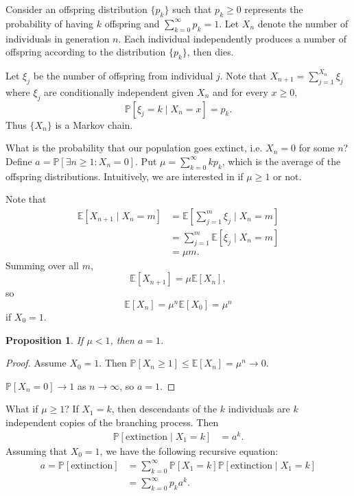 \documentclass{tufte-handout}
\newcommand*\E{\mathbb{E}}
\renewcommand*\P{\mathbb{P}}
\newtheorem{prop}[thm]{Proposition}
\theoremstyle{definition}
\begin{document}
Consider an offspring distribution $\{p_k\}$ such that $p_k \ge 0$ represents the probability of having $k$ offspring and $\sum_{k=0}^{\infty} p_k =1$. Let $X_n$ denote the number of individuals in generation $n$. Each individual independently produces a number of offspring according to the distribution $\{p_k\}$, then dies.

Let $\xi_j$ be the number of offspring from individual $j$.
Note that $X_{n+1} = \sum\limits_{j=1}^{X_n} \xi_j$ where $\xi_j$ are conditionally independent given $X_n$ and for every $x \ge 0$, \[
	\P\left[\xi_j = k \mid X_n = x\right] = p_k
.\] Thus $\{X_n\}$ is a Markov chain.

What is the probability that our population goes extinct, i.e. $X_n = 0$ for some $n$? Define $a = \P\left[\exists n \ge 1 : X_n = 0\right]$. Put $\mu = \sum\limits_{k=0}^{\infty} k p_k$, which is the average of the offspring distributions. Intuitively, we are interested in if $\mu \ge 1$ or not.

Note that
\begin{align*}
	\E\left[X_{n+1} \mid X_n = m\right]  &= \E\left[\sum\limits_{j=1}^{m} \xi_j \mid X_n = m\right]  \\
	&= \sum\limits_{j=1}^{m} \E\left[\xi_j \mid X_n = m\right]  \\
	&= \mu m
.\end{align*}
Summing over all $m$, \[
	\E\left[X_{n+1}\right] = \mu \E\left[X_n\right] 
,\] so \[
	\E\left[X_n\right] = \mu^{n} \E\left[X_0\right] = \mu^{n}
\] if $X_0 = 1$. 

\begin{prop}
	If $\mu < 1$, then $a=1$. 
\end{prop}
\begin{proof}
	Assume $X_0 = 1$. Then $\P\left[X_n \ge 1\right] \le \E\left[X_n\right] = \mu^{n}\to 0$.

	$\P\left[X_n = 0\right] \to 1$ as $n\to \infty$, so $a = 1$.
\end{proof}

What if $\mu \ge 1$?
If $X_1 = k$, then descendants of the $k$ individuals are $k$ independent copies of the branching process. Then 
\begin{align*}
	\P\left[\text{extinction} \mid X_1 = k\right] &= a^{k}
.\end{align*}
Assuming that $X_0 = 1$, we have the following recursive equation:
\begin{align*}
	a= \P\left[\text{extinction}\right] &= \sum\limits_{k=0}^{\infty} \P\left[X_1 = k\right] \P\left[\text{extinction} \mid X_1 = k\right]  \\
										&= \sum\limits_{k=0}^{\infty} p_k a^k
.\end{align*}
\end{document}
